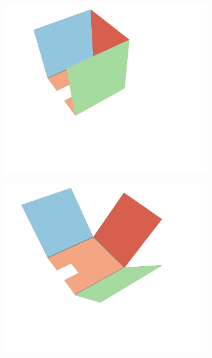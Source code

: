 \vspace{0.5cm}

\begin{figure}[h]
\captionsetup[subfigure]{justification=centering}
\vspace{-2ex}
	\centering
    \setlength{\subfigureWidth}{0.32\textwidth}
    \setlength{\graphicsHeight}{40mm} %
    \hypersetup{hidelinks=true}%
	\begin{subfigure}[t]{\subfigureWidth}
        \centering
		\includegraphics[height=\graphicsHeight]{sections/design/solar-array/images/deployment/iani-chaos/solar_array_deployment_iani_chaos_000.png}
		\label{fig:sub:deployment-sequence-iani-chaos-stowed}
	\end{subfigure}\hfill
	\begin{subfigure}[t]{\subfigureWidth}
        \centering
		\includegraphics[height=\graphicsHeight]{sections/design/solar-array/images/deployment/iani-chaos/solar_array_deployment_iani_chaos_030.png}

\end{subfigure}
\end{figure}

